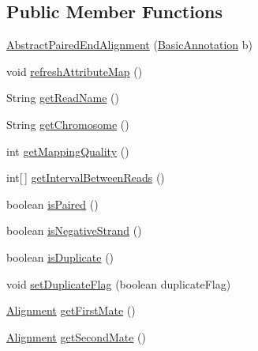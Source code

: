 \subsection*{Public Member Functions}
\begin{DoxyCompactItemize}
\item 
\hyperlink{classumms_1_1core_1_1alignment_1_1_abstract_paired_end_alignment_a9f5af881ce3ac34580b3acd221ef3811}{Abstract\+Paired\+End\+Alignment} (\hyperlink{classumms_1_1core_1_1annotation_1_1_basic_annotation}{Basic\+Annotation} b)
\item 
void \hyperlink{classumms_1_1core_1_1alignment_1_1_abstract_paired_end_alignment_a2667daa31887746ce06f4799495b24fa}{refresh\+Attribute\+Map} ()
\item 
String \hyperlink{classumms_1_1core_1_1alignment_1_1_abstract_paired_end_alignment_a8c6173f422b8e037747b02f8d728efe4}{get\+Read\+Name} ()
\item 
String \hyperlink{classumms_1_1core_1_1alignment_1_1_abstract_paired_end_alignment_a4e81aeaa83886f64c780bbedbb88a839}{get\+Chromosome} ()
\item 
int \hyperlink{classumms_1_1core_1_1alignment_1_1_abstract_paired_end_alignment_a0fa29adb0a3285800e542b174ef4084d}{get\+Mapping\+Quality} ()
\item 
int\mbox{[}$\,$\mbox{]} \hyperlink{classumms_1_1core_1_1alignment_1_1_abstract_paired_end_alignment_a37c576222ddbb88a5afca64ba6049996}{get\+Interval\+Between\+Reads} ()
\item 
boolean \hyperlink{classumms_1_1core_1_1alignment_1_1_abstract_paired_end_alignment_a3c5cbd4ef536d5c63105eca0fde0d141}{is\+Paired} ()
\item 
boolean \hyperlink{classumms_1_1core_1_1alignment_1_1_abstract_paired_end_alignment_af37e974bc3b52387663422c762994f94}{is\+Negative\+Strand} ()
\item 
boolean \hyperlink{classumms_1_1core_1_1alignment_1_1_abstract_paired_end_alignment_aa13e1931258062454882ba057a6a2ea4}{is\+Duplicate} ()
\item 
void \hyperlink{classumms_1_1core_1_1alignment_1_1_abstract_paired_end_alignment_a9b214481a55d504376cf4389f5153102}{set\+Duplicate\+Flag} (boolean duplicate\+Flag)
\item 
\hyperlink{interfaceumms_1_1core_1_1alignment_1_1_alignment}{Alignment} \hyperlink{classumms_1_1core_1_1alignment_1_1_abstract_paired_end_alignment_a35a255d4328f1e1ad9c2374f5900ceab}{get\+First\+Mate} ()
\item 
\hyperlink{interfaceumms_1_1core_1_1alignment_1_1_alignment}{Alignment} \hyperlink{classumms_1_1core_1_1alignment_1_1_abstract_paired_end_alignment_aeb289b5bce028d7819f8f893a44be774}{get\+Second\+Mate} ()

\end{DoxyCompactItemize}
